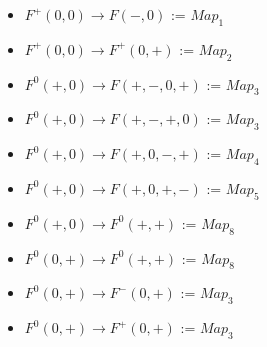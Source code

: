 \begin{itemize}
\begin{itemize}
\item $F^+(0,0)\rightarrow F(-,0)$ := $Map_1$
\item $F^+(0,0)\rightarrow F^+(0,+)$ := $Map_2$
\item $F^0(+,0)\rightarrow F(+,-,0,+)$ := $Map_3$
\item $F^0(+,0)\rightarrow F(+,-,+,0)$ := $Map_3$
\item $F^0(+,0)\rightarrow F(+,0,-,+)$ := $Map_4$
\item $F^0(+,0)\rightarrow F(+,0,+,-)$ := $Map_5$
\item $F^0(+,0)\rightarrow F^0(+,+)$ := $Map_8$
\item $F^0(0,+)\rightarrow F^0(+,+)$ := $Map_8$
\item $F^0(0,+)\rightarrow F^-(0,+)$ := $Map_3$
\item $F^0(0,+)\rightarrow F^+(0,+)$ := $Map_3$
\end{itemize}


\end{itemize}
